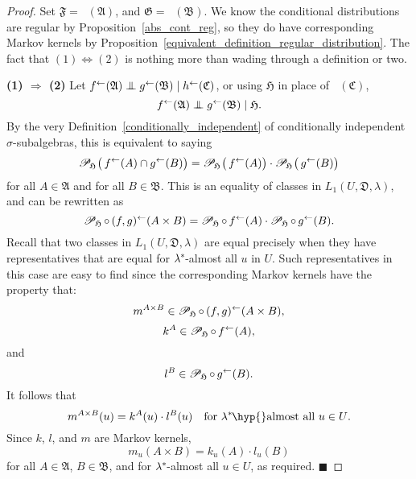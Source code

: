 \documentclass[
twoside=true,
paper=letter,
fontsize=9pt,
pagesize=auto,
leqno,
openany,
headsepline,
overfullrule,
]{scrbook}
\theoremstyle{plain}
\theoremstyle{plain}
\theoremstyle{definition}
\theoremstyle{bfnoteitalic}
\theoremstyle{bfnoteroman}
\newcommand{\sigalg}[1]{\mathfrak{#1}}
\newcommand{\cali}[1]{\mathscr{#1}}
\renewcommand{\qedsymbol}{$\blacksquare$}
\newcommand{\condprobsub}[2]
{\mathop{\cali{P}\hspace{-1.5pt}}\nolimits_{#2}\hspace{-1pt}\left(#1\right)}
\newcommand{\condprobop}[1]{\mathop{\cali{P}\hspace{-1pt}}\nolimits_{#1}}
\newcommand{\textsigma}{\hbox{\large{$\sigma$}}\kern-1pt}
\newcommand{\preimage}[1]{\mathop{#1^{\leftarrow}}}
\newcommand{\meets}{\cap}
\newcommand{\sigmaalgebra}{\sigalg{A}}
\newcommand{\sigmaalgebraii}{\sigalg{B}}
\newcommand{\sigmaalgebraiii}{\sigalg{C}}
\newcommand{\kernast}{\ast\kern-1pt}
\newcommand{\lilstrut}{\vphantom{\bigl(}}
\newcommand{\funcf}{f}
\newcommand{\funcg}{g}
\newcommand{\funch}{h}
\newcommand{\funck}{k}
\newcommand{\funcl}{l}
\newcommand{\funcm}{m}
\newcommand{\measureiii}{\lambda}
\newcommand{\measlambda}{\lambda}
\newcommand{\seti}{A}
\newcommand{\setii}{B}
\newcommand{\uspace}{U}%
\newcommand{\uspaceelt}{u}
\newcommand{\uspacesig}{\sigalg{D}}
\newcommand{\condindep}[3]{#1\perp\kern-6pt\perp #2\mid #3}
\begin{document}
\begin{proof}
Set 
$\sigalg{F}=\preimage{\funcf}(\sigmaalgebra)$, 
and $\sigalg{G}=\preimage{\funcg}(\sigmaalgebraii)$.
We know the conditional distributions
are regular by Proposition~\ref{abs_cont_reg}, so they do have corresponding Markov kernels by Proposition~\ref{equivalent_definition_regular_distribution}.
The fact that $(1) \Leftrightarrow (2)$ is nothing more than wading through a definition or two.

\textbf{(1) $\Rightarrow$ (2)}\quad
Let
$\condindep{\preimage{\funcf}(\sigmaalgebra)}{\preimage{\funcg}(\sigmaalgebraii)}
{\preimage{\funch}(\sigmaalgebraiii)}$, or using $\sigalg{H}$ in place of
$\preimage{\funch}(\sigmaalgebraiii)$,
\[
\condindep{\preimage{\funcf}(\sigmaalgebra)}{\preimage{\funcg}(\sigmaalgebraii)}
{\sigalg{H}}.
\]
By the very Definition~\ref{conditionally_independent} of conditionally independent \textsigma\hyp{}subalgebras,
this is equivalent to saying
\[
\condprobsub{\lilstrut\preimage{\funcf}(\seti) \meets \preimage{\funcg}(\setii)}{\sigalg{H}}
=
\condprobsub{\lilstrut\preimage{\funcf}(\seti)}{\sigalg{H}}
\cdot
\condprobsub{\lilstrut\preimage{\funcg}(\setii)}{\sigalg{H}}
\]
for all $\seti\in\sigmaalgebra$ and for all $\setii\in\sigmaalgebraii$.
This is an equality of classes in
$L_1(\uspace,\uspacesig,\measureiii)$, and can be rewritten as
\begin{equation}
\condprobop{\sigalg{H}} \circ \preimage{(\funcf,\funcg)}
(\seti\times\setii)
=
\condprobop{\sigalg{H}}\circ \preimage{\funcf}(\seti)
\cdot
\condprobop{\sigalg{H}}\circ \preimage{\funcg}(\setii).
\end{equation}
Recall that two classes in
$L_1(\uspace,\uspacesig,\measureiii)$
are equal precisely when they have representatives that are equal for
$\measlambda^\kernast$\hyp{}almost all $\uspaceelt$ in  $\uspace$.
Such representatives in this case are easy to find since
the corresponding Markov kernels have the property that:
\[
\funcm^{\seti\times\setii} \in
\condprobop{\sigalg{H}} \circ \preimage{(\funcf,\funcg)}
(\seti\times\setii),
\]
\[
\funck^\seti \in
\condprobop{\sigalg{H}}\circ \preimage{\funcf}(\seti),
\]
and
\[
\funcl^\setii \in
\condprobop{\sigalg{H}}\circ \preimage{\funcg}(\setii).
\]
It follows that
\[
\funcm^{\seti\times\setii}(\uspaceelt)
=
\funck^\seti(\uspaceelt)
\cdot
\funcl^\setii(\uspaceelt)
\quad
\text{for $\measlambda^\kernast$\hyp{}almost all $\uspaceelt\in\uspace$.}
\]
Since $\funck$, $\funcl$, and $\funcm$ are Markov kernels,
\[
\funcm_\uspaceelt(\seti\times\setii)
=
\funck_\uspaceelt(\seti)
\cdot
\funcl_\uspaceelt(\setii)
\]
for all $\seti\in\sigmaalgebra$, $\setii\in\sigmaalgebraii$, and for
$\measlambda^\kernast$\hyp{}almost all $\uspaceelt\in\uspace$, as required.
\hfill\qedsymbol


\end{proof}
\end{document}
